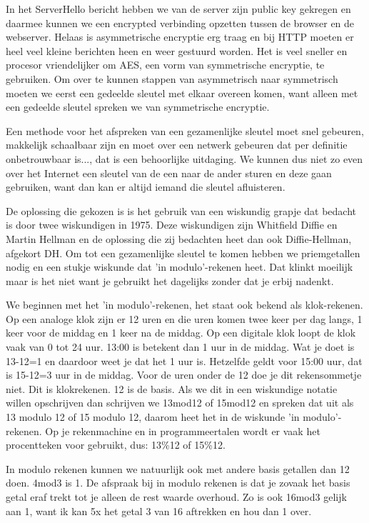 In het ServerHello bericht hebben we van de server zijn public key gekregen en daarmee kunnen we een encrypted verbinding opzetten tussen de browser en de webserver. Helaas is asymmetrische encryptie erg traag en bij HTTP moeten er heel veel kleine berichten heen en weer gestuurd worden. Het is veel sneller en procesor vriendelijker om AES, een vorm van symmetrische encryptie, te gebruiken. Om over te kunnen stappen van asymmetrisch naar symmetrisch moeten we eerst een gedeelde sleutel met elkaar overeen komen, want alleen met een gedeelde sleutel spreken we van symmetrische encryptie.

Een methode voor het afspreken van een gezamenlijke sleutel moet snel gebeuren, makkelijk schaalbaar zijn en moet over een netwerk gebeuren dat per definitie onbetrouwbaar is..., dat is een behoorlijke uitdaging. We kunnen dus niet zo even over het Internet een sleutel van de een naar de ander sturen en deze gaan gebruiken, want dan kan er altijd iemand die sleutel afluisteren.

De oplossing die gekozen is is het gebruik van een wiskundig grapje dat bedacht is door twee wiskundigen in 1975. Deze wiskundigen zijn Whitfield Diffie en Martin Hellman en de oplossing die zij bedachten heet dan ook Diffie-Hellman, afgekort DH. Om tot een gezamenlijke sleutel te komen hebben we priemgetallen nodig en een stukje wiskunde dat 'in modulo'-rekenen heet. Dat klinkt moeilijk maar is het niet want je gebruikt het dagelijks zonder dat je erbij nadenkt.

We beginnen met het 'in modulo'-rekenen, het staat ook bekend als klok-rekenen. Op een analoge klok zijn er 12 uren en die uren komen twee keer per dag langs, 1 keer voor de middag en 1 keer na de middag. Op een digitale klok loopt de klok vaak van 0 tot 24 uur. 13:00 is betekent dan 1 uur in de middag. Wat je doet is 13-12=1 en daardoor weet je dat het 1 uur is. Hetzelfde geldt voor 15:00 uur, dat is 15-12=3 uur in de middag. Voor de uren onder de 12 doe je dit rekensommetje niet. Dit is klokrekenen. 12 is de basis. Als we dit in een wiskundige notatie willen opschrijven dan schrijven we 13mod12 of 15mod12 en spreken dat uit als 13 modulo 12 of 15 modulo 12, daarom heet het in de wiskunde 'in modulo'-rekenen. Op je rekenmachine en in programmeertalen wordt er vaak het procentteken voor gebruikt, dus: 13\%12 of 15\%12.

In modulo rekenen kunnen we natuurlijk ook met andere basis getallen dan 12 doen. 4mod3 is 1. De afspraak bij in modulo rekenen is dat je zovaak het basis getal eraf trekt tot je alleen de rest waarde overhoud. Zo is ook 16mod3 gelijk aan 1, want ik kan 5x het getal 3 van 16 aftrekken en hou dan 1 over.

